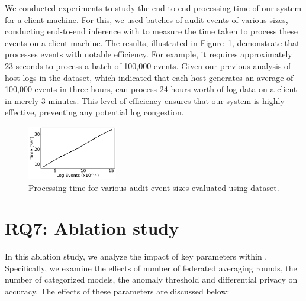  We conducted experiments to study the end-to-end processing time of our system for a client machine. For this, we used batches of audit events of various sizes, conducting end-to-end inference with \Sys to measure the time taken to process these events on a client machine. The results, illustrated in Figure~\ref{sizevstime}, demonstrate that \Sys processes events with notable efficiency. For example, it requires approximately 23 seconds to process a batch of 100,000 events. Given our previous analysis of host logs in the \optc dataset, which indicated that each host generates an average of 100,000 events in three hours, \Sys can process 24 hours worth of log data on a client in merely 3 minutes. This level of efficiency ensures that our system is highly effective, preventing any potential log congestion.

\begin{figure}[!h]
  \centering
  \includegraphics[width=0.35\textwidth]{fig/sizevstime.pdf}
  \caption{Processing time for various audit event sizes evaluated using \optc dataset. }
  \label{sizevstime}
  \vspace{-2ex}
 \end{figure}


\section{RQ7: Ablation study}
\label{app:ablation}

In this ablation study, we analyze the impact of key parameters within \Sys. Specifically, we examine the effects of number of federated averaging rounds, the number of \gnnshort categorized models, the anomaly threshold and differential privacy on accuracy. The effects of these parameters are discussed below:



